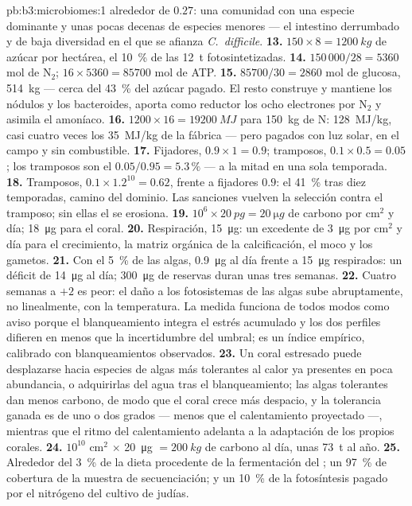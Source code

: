 \begin{solution}{pb:b3:microbiomes:1}
alrededor de $0.27$: una comunidad con una especie dominante y unas pocas
decenas de especies menores --- el intestino derrumbado y de baja
diversidad en el que se afianza \emph{C.~difficile}.
\textbf{13.} $150\times 8 = \qty{1200}{kg}$ de azúcar por hectárea, el
\qty{10}{\%} de las \qty{12}{t} fotosintetizadas.
\textbf{14.} $150\,000/28 = 5360$ mol de N$_{2}$; $16\times 5360 =
\num{85700}$ mol de ATP.
\textbf{15.} $\num{85700}/30 = 2860$ mol de glucosa, \qty{514}{kg} ---
cerca del \qty{43}{\%} del azúcar pagado. El resto construye y mantiene
los nódulos y los bacteroides, aporta como reductor los ocho electrones
por N$_{2}$ y asimila el amoníaco.
\textbf{16.} $1200\times 16 = \qty{19200}{MJ}$ para \qty{150}{kg} de N:
\qty{128}{MJ/kg}, casi cuatro veces los \qty{35}{MJ/kg} de la fábrica ---
pero pagados con luz solar, en el campo y sin combustible.
\textbf{17.} Fijadores, $0.9\times 1 = 0.9$; tramposos, $0.1\times 0.5 =
0.05$; los tramposos son el $0.05/0.95 = 5.3\,\%$ --- a la mitad en una
sola temporada.
\textbf{18.} Tramposos, $0.1\times 1.2^{10} = 0.62$, frente a fijadores
$0.9$: el \qty{41}{\%} tras diez temporadas, camino del dominio. Las
sanciones vuelven la selección contra el tramposo; sin ellas el
 se erosiona.
\textbf{19.} $10^{6}\times \qty{20}{pg} = \qty{20}{\micro g}$ de carbono
por cm$^{2}$ y día; \qty{18}{\micro g} para el coral.
\textbf{20.} Respiración, \qty{15}{\micro g}: un excedente de
\qty{3}{\micro g} por cm$^{2}$ y día para el crecimiento, la matriz
orgánica de la calcificación, el moco y los gametos.
\textbf{21.} Con el \qty{5}{\%} de las algas, \qty{0.9}{\micro g} al día
frente a \qty{15}{\micro g} respirados: un déficit de \qty{14}{\micro g}
al día; \qty{300}{\micro g} de reservas duran unas tres semanas.
\textbf{22.} Cuatro semanas a $+2$ es peor: el daño a los fotosistemas de
las algas sube abruptamente, no linealmente, con la temperatura. La
medida funciona de todos modos como aviso porque el blanqueamiento
integra el estrés acumulado y los dos perfiles difieren en menos que la
incertidumbre del umbral; es un índice empírico, calibrado con
blanqueamientos observados.
\textbf{23.} Un coral estresado puede desplazarse hacia especies de algas
más tolerantes al calor ya presentes en poca abundancia, o adquirirlas
del agua tras el blanqueamiento; las algas tolerantes dan menos carbono,
de modo que el coral crece más despacio, y la tolerancia ganada es de uno
o dos grados --- menos que el calentamiento proyectado ---, mientras que
el ritmo del calentamiento adelanta a la adaptación de los propios
corales.
\textbf{24.} $10^{10}$ cm$^{2}$ $\times$ \qty{20}{\micro g} $=
\qty{200}{kg}$ de carbono al día, unas \qty{73}{t} al año.
\textbf{25.} Alrededor del \qty{3}{\%} de la dieta procedente de la
fermentación del ; un \qty{97}{\%} de cobertura de la muestra
de secuenciación; y un \qty{10}{\%} de la fotosíntesis pagado por el
nitrógeno del cultivo de judías.
\end{solution}
